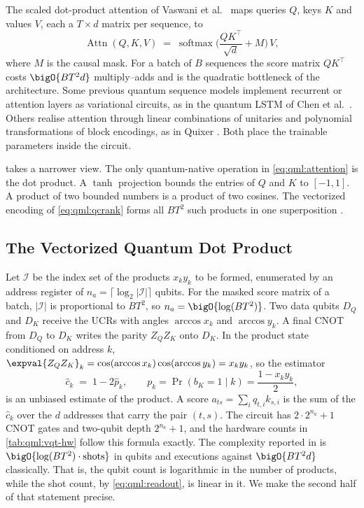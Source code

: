 The scaled dot-product attention of Vaswani et al.~\cite{vaswani2017attention} maps queries $Q$, keys $K$ and values $V$, each a $T \times d$ matrix per sequence, to
\begin{equation}\label{eq:qml:attention}
\operatorname{Attn}(Q,K,V) \;=\; \operatorname{softmax}\!\Big(\frac{QK^{\top}}{\sqrt{d}} + M\Big)\,V,
\end{equation}
where $M$ is the causal mask. For a batch of $B$ sequences the score matrix $QK^\top$ costs $\bigO{BT^2 d}$ multiply--adds and is the quadratic bottleneck of the architecture. Some previous quantum sequence models implement recurrent or attention layers as variational circuits, as in the quantum LSTM of Chen et al.~\cite{chen2022qlstm}. Others realise attention through linear combinations of unitaries and polynomial transformations of block encodings, as in Quixer \cite{khatri2024quixer}. Both place the trainable parameters inside the circuit.

\vqt{} takes a narrower view. The only quantum-native operation in \cref{eq:qml:attention} is the dot product. A $\tanh$ projection bounds the entries of $Q$ and $K$ to $[-1,1]$. A product of two bounded numbers is a product of two cosines. The vectorized encoding of \cref{eq:qml:qcrank} forms all $BT^2$ such products in one superposition \cite{guo2025vqt}.

\subsection{The Vectorized Quantum Dot Product}\label{sec:qml:vqt:vqdp}

Let $\mathcal{I}$ be the index set of the products $x_k y_k$ to be formed, enumerated by an address register of $n_a = \lceil \log_2 |\mathcal{I}| \rceil$ qubits. For the masked score matrix of a batch, $|\mathcal{I}|$ is proportional to $BT^2$, so $n_a = \bigO{\log(BT^2)}$. Two data qubits $D_Q$ and $D_K$ receive the UCRs with angles $\arccos x_k$ and $\arccos y_k$. A final CNOT from $D_Q$ to $D_K$ writes the parity $Z_Q Z_K$ onto $D_K$. In the product state conditioned on address $k$, $\expval{Z_Q Z_K}_k = \cos(\arccos x_k)\cos(\arccos y_k) = x_k y_k$, so the estimator
\begin{equation}\label{eq:qml:vqdp}
\hat{c}_k \;=\; 1 - 2\hat{p}_k, \qquad p_k = \Pr(b_K = 1 \mid k) = \frac{1 - x_k y_k}{2},
\end{equation}
is an unbiased estimate of the product. A score $a_{ts} = \sum_{i} q_{t,i} k_{s,i}$ is the sum of the $\hat{c}_k$ over the $d$ addresses that carry the pair $(t,s)$. The circuit has $2 \cdot 2^{n_a} + 1$ CNOT gates and two-qubit depth $2^{n_a} + 1$, and the hardware counts in \cref{tab:qml:vqt-hw} follow this formula exactly. The complexity reported in \cite{guo2025vqt} is $\bigO{\log(BT^2)\cdot \text{shots}}$ in qubits and executions against $\bigO{BT^2 d}$ classically. That is, the qubit count is logarithmic in the number of products, while the shot count, by \cref{eq:qml:readout}, is linear in it. We make the second half of that statement precise.

